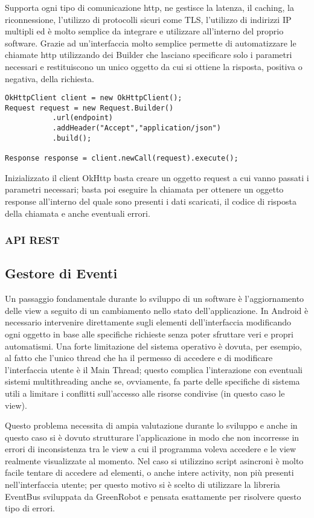 Supporta ogni tipo di comunicazione http, ne gestisce la latenza, il caching, la riconnessione, l'utilizzo di protocolli sicuri come TLS, l'utilizzo di indirizzi IP multipli ed è molto semplice da integrare e utilizzare all'interno del proprio software.
Grazie ad un'interfaccia molto semplice permette di automatizzare le chiamate http utilizzando dei Builder che lasciano specificare solo i parametri necessari e restituiscono un unico oggetto da cui si ottiene la risposta, positiva o negativa, della richiesta.

\begin{lstlisting}
OkHttpClient client = new OkHttpClient();
Request request = new Request.Builder()
           .url(endpoint)
           .addHeader("Accept","application/json")
           .build();

Response response = client.newCall(request).execute();
\end{lstlisting}

Inizializzato il client OkHttp basta creare un oggetto request a cui vanno passati i parametri necessari; basta poi eseguire la chiamata per ottenere un oggetto response all'interno del quale sono presenti i dati scaricati, il codice di risposta della chiamata e anche eventuali errori.

\subsubsection{API REST}


\subsection{Gestore di Eventi}
Un passaggio fondamentale durante lo sviluppo di un software è l'aggiornamento delle view a seguito di un cambiamento nello stato dell'applicazione.
In Android è necessario intervenire direttamente sugli elementi dell'interfaccia modificando ogni oggetto in base alle specifiche richieste senza poter sfruttare veri e propri automatismi.
Una forte limitazione del sistema operativo è dovuta, per esempio, al fatto che l'unico thread che ha il permesso di accedere e di modificare l'interfaccia utente è il Main Thread; questo complica l'interazione con eventuali sistemi multithreading anche se, ovviamente, fa parte delle specifiche di sistema utili a limitare i conflitti sull'accesso alle risorse condivise (in questo caso le view).

Questo problema necessita di ampia valutazione durante lo sviluppo e anche in questo caso si è dovuto strutturare l'applicazione in modo che non incorresse in errori di inconsistenza tra le view a cui il programma voleva accedere e le view realmente visualizzate al momento.
Nel caso si utilizzino script asincroni è molto facile tentare di accedere ad elementi, o anche intere activity, non più presenti nell'interfaccia utente; per questo motivo si è scelto di utilizzare la libreria EventBus sviluppata da GreenRobot \autocite{GITHUB:EVENTBUS} e pensata esattamente per risolvere questo tipo di errori.

